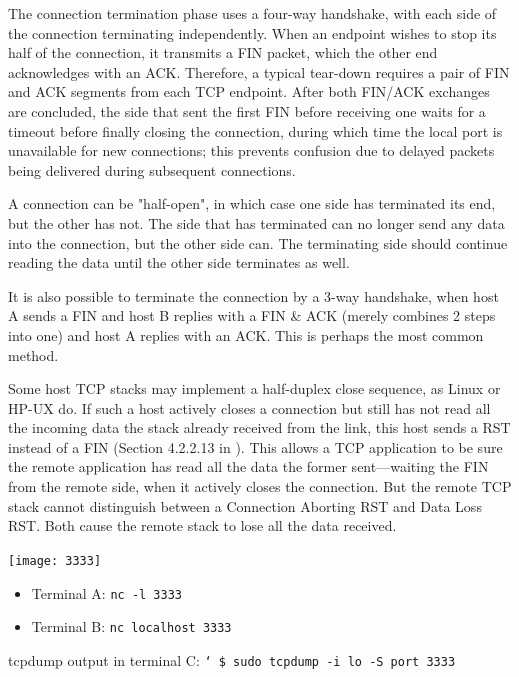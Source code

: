 The connection termination phase uses a four-way handshake, with each side of the
connection terminating independently. When an endpoint wishes to stop its half of the
connection, it transmits a FIN packet, which the other end acknowledges with an
ACK. Therefore, a typical tear-down requires a pair of FIN and ACK segments from each TCP
endpoint. After both FIN/ACK exchanges are concluded, the side that sent the first FIN
before receiving one waits for a timeout before finally closing the connection, during
which time the local port is unavailable for new connections; this prevents confusion due
to delayed packets being delivered during subsequent connections. 

A connection can be "half-open", in which case one side has terminated its end, but the
other has not. The side that has terminated can no longer send any data into the
connection, but the other side can. The terminating side should continue reading the data
until the other side terminates as well.

It is also possible to terminate the connection by a 3-way handshake, when host A sends a
FIN and host B replies with a FIN \& ACK (merely combines 2 steps into one) and host A
replies with an ACK. This is perhaps the most common method.

Some host TCP stacks may implement a half-duplex close sequence, as Linux or HP-UX do. If
such a host actively closes a connection but still has not read all the incoming data the
stack already received from the link, this host sends a RST instead of a FIN (Section
4.2.2.13 in ). This allows a TCP application to be sure the
remote application has read all the data the former sent—waiting the FIN from the remote
side, when it actively closes the connection. But the remote TCP stack cannot distinguish
between a Connection Aborting RST and Data Loss RST. Both cause the remote stack to lose
all the data received.


\begin{frame}%
  \begin{minipage}{.2\linewidth}
    \texttt{[image: 3333]}
  \end{minipage}
  \begin{minipage}{.78\linewidth}
    \begin{itemize}
    \item Terminal A: \texttt{nc -l 3333}
    \item Terminal B: \texttt{nc localhost 3333}
    \end{itemize}
  \end{minipage}
  \begin{block}{tcpdump output in terminal C:}
    \texttt{\char`~\$ sudo tcpdump -i lo -S port 3333}
    \begin{center}
    \end{center}
  \end{block}
\end{frame}

